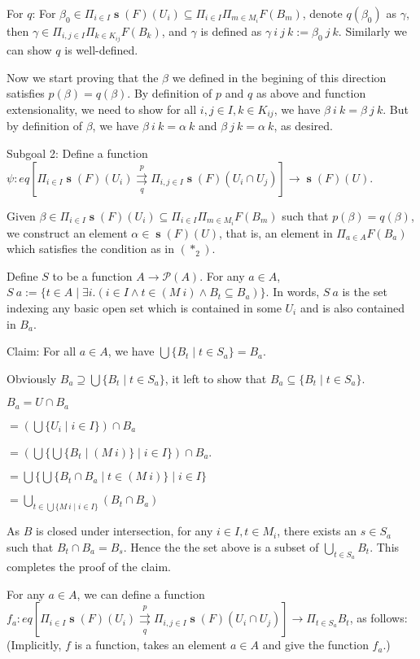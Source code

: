 \documentclass[a4paper]{article}
\DeclareMathOperator{\s}{\mathbf s}
\begin{document}
For $q$: For $\beta_0\in \Pi_{i\in I}\s(F)(U_i)\subseteq \Pi_{i\in I}\Pi_{m\in M_i}F(B_m)$, denote $q(\beta_0)$ as $\gamma$, then $\gamma\in \Pi_{i,j\in I}\Pi_{k\in K_{ij}}F(B_k)$, and $\gamma$ is defined as $\gamma \ i \ j \ k :=\beta_0 \ j \ k$. Similarly we can show $q$ is well-defined.

Now we start proving that the $\beta$ we defined in the begining of this direction satisfies $p(\beta)=q(\beta)$. By definition of $p$ and $q$ as above and function extensionality, we need to show for all $i,j\in I,k\in K_{ij}$, we have $\beta \ i \ k = \beta \ j \ k$. But by definition of $\beta$, we have $\beta \ i \ k =\alpha \ k$ and $\beta \ j \ k = \alpha \ k$, as desired.


Subgoal 2: Define a function $\psi:eq[\Pi_{i\in I}\s(F)(U_i)\overset{p}{\underset{q}\rightrightarrows}\Pi_{i,j\in I}\s(F)(U_i\cap U_j)]\to \s(F)(U)$. 

Given $\beta \in \Pi_{i\in I}\s(F)(U_i)\subseteq \Pi_{i\in I}\Pi_{m\in M_i}F(B_m)$ such that $p(\beta)=q(\beta)$, we construct an element $\alpha\in \s(F)(U)$, that is, an element in $\Pi_{a\in A}F(B_a)$ which satisfies the condition as in $(*_2)$. 

Define $S$ to be a function $A\to {\mathcal P}(A)$. For any $a\in A$, $S \ a := \{t\in A\mid \exists i. (i\in I \land t\in (M \ i) \land B_t\subseteq B_a)\}$. In words, $S \ a$ is the set indexing any basic open set which is contained in some $U_i$ and is also contained in $B_a$.

Claim: For all $a\in A$, we have $\bigcup \{B_t\mid t\in S_a\}=B_a$.

Obviously $B_a\supseteq \bigcup\{B_t\mid t\in S_a\}$, it left to show that $B_a\subseteq \{B_t\mid t\in S_a\}$.

$B_a=U\cap B_a$

$= (\bigcup \{U_i\mid i\in I\})\cap B_a$

$= (\bigcup \{\bigcup \{B_t\mid (M \ i)\}\mid i\in I\})\cap B_a$.

$= \bigcup \{\bigcup \{B_t\cap B_a\mid t\in (M \ i)\}\mid i\in I\}$

$=\bigcup_{t\in \bigcup \{M \ i \mid i\in I\}}(B_t\cap B_a)$

As $B$ is closed under intersection, for any $i\in I, t\in M_i$, there exists an $s\in S_a$ such that $B_t\cap B_a=B_s$. Hence the the set above is a subset of $\bigcup_{t\in S_a}B_t$. This completes the proof of the claim.

For any $a\in A$, we can define a function $f_a:eq[\Pi_{i\in I}\s(F)(U_i)\overset{p}{\underset{q}\rightrightarrows}\Pi_{i,j\in I}\s(F)(U_i\cap U_j)]\to \Pi_{t\in S_a}B_t$, as follows:
(Implicitly, $f$ is a function, takes an element $a\in A$ and give the function $f_a$.)
\end{document}
